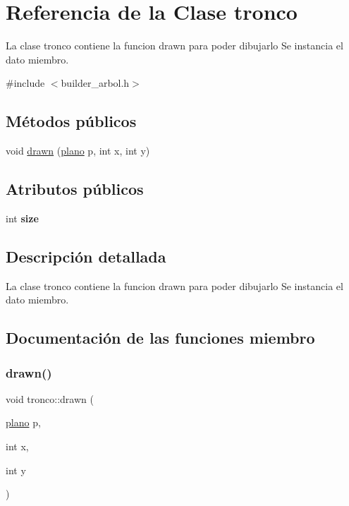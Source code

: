 \hypertarget{classtronco}{}\section{Referencia de la Clase tronco}
\label{classtronco}


La clase tronco contiene la funcion drawn para poder dibujarlo  Se instancia el dato miembro.  




{\ttfamily \#include $<$builder\+\_\+arbol.\+h$>$}

\subsection*{Métodos públicos}
\begin{DoxyCompactItemize}
\item 
void \hyperlink{classtronco_a8994db3bd2b43773f71311f2e0146e44}{drawn} (\hyperlink{classplano}{plano} p, int x, int y)
\end{DoxyCompactItemize}
\subsection*{Atributos públicos}
\begin{DoxyCompactItemize}
\item 
\mbox{\label{classtronco_adc9931467b34c8d6436eb220d672d08d}} 
int {\bfseries size}
\end{DoxyCompactItemize}


\subsection{Descripción detallada}
La clase tronco contiene la funcion drawn para poder dibujarlo  Se instancia el dato miembro. 

\subsection{Documentación de las funciones miembro}
\mbox{\label{classtronco_a8994db3bd2b43773f71311f2e0146e44}} 
\subsubsection{\texorpdfstring{drawn()}{drawn()}}
{\footnotesize\ttfamily void tronco\+::drawn (\begin{DoxyParamCaption}\item[{\hyperlink{classplano}{plano}}]{p,  }\item[{int}]{x,  }\item[{int}]{y }\end{DoxyParamCaption})}

